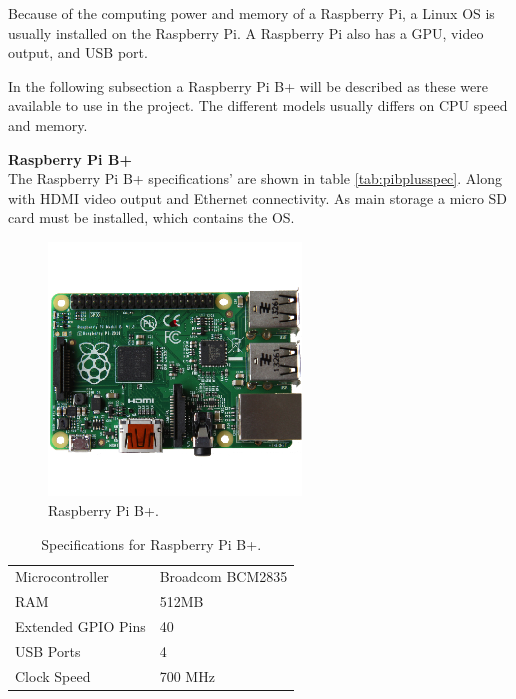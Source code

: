 Because of the computing power and memory of a Raspberry Pi, a Linux OS is usually installed on the Raspberry Pi\cite{Arduino_linux}. A Raspberry Pi also has a GPU, video output, and USB port.

In the following subsection a Raspberry Pi B+ will be described as these were available to use in the project. The different models usually differs on CPU speed and memory.

\textbf{Raspberry Pi B+}\\
The Raspberry Pi B+ specifications' are shown in table \ref{tab:pibplusspec}. Along with HDMI video output and Ethernet connectivity. As main storage a micro SD card must be installed, which contains the OS.

\begin{figure}[H]
\centering
\includegraphics[width=0.6\textwidth]{chapters/analysis/figs/raspberry-pi-model-b-plus.png}
\caption{Raspberry Pi B+\cite{pibplus}.}
\label{fig:pibplus}
\end{figure}

\begin{table}[H]
\centering
\begin{tabular}{| l | l |}
\hline
Microcontroller & Broadcom BCM2835\\
RAM & 512MB\\
Extended GPIO Pins & 40\\
USB Ports & 4\\
Clock Speed & 700 MHz\\
\hline
\end{tabular}
\caption{Specifications for Raspberry Pi B+\cite{pispecs}.}
\end{table}
\label{tab:pibplusspec}
